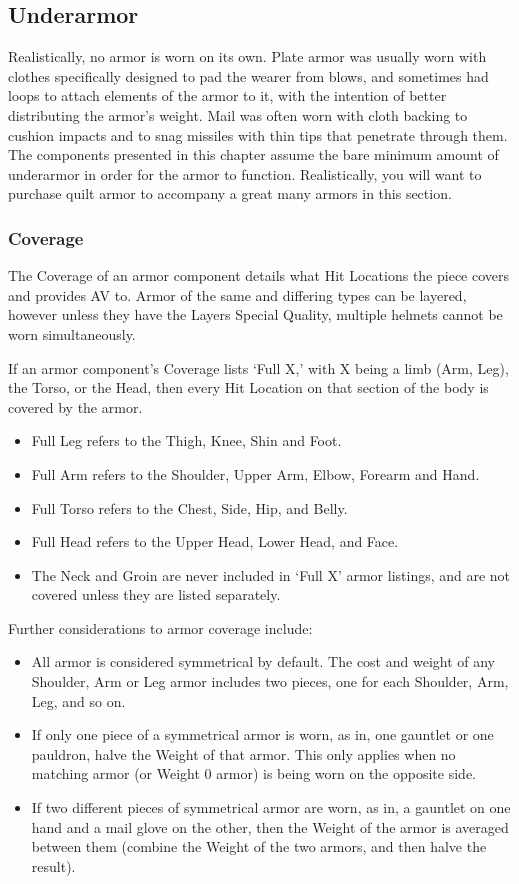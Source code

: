 \documentclass[oneside,11pt,english]{book}
\begin{document}
\subsection{Underarmor}
Realistically, no armor is worn on its own. Plate armor was usually worn with clothes specifically designed to pad the 
wearer from blows, and sometimes had loops to attach elements of the armor to it, with the intention of better 
distributing the armor’s weight. Mail was often worn with cloth backing to cushion impacts and to snag missiles with 
thin tips that penetrate through them.
The components presented in this chapter assume the bare minimum amount of underarmor in order for the armor to 
function. Realistically, you will want to purchase quilt armor to accompany a great many armors in this section.

\subsubsection{Coverage}
The Coverage of an armor component details what Hit Locations the piece covers and provides AV to. Armor of the 
same and differing types can be layered, however unless they have the Layers Special Quality, multiple helmets 
cannot be worn simultaneously.

If an armor component’s Coverage lists ‘Full X,’ with X being a limb (Arm, Leg), the Torso, or the Head, then every 
Hit Location on that section of the body is covered by the armor. 

\begin{itemize}
\item Full Leg refers to the Thigh, Knee, Shin and Foot.
\item Full Arm refers to the Shoulder, Upper Arm, Elbow, Forearm and Hand.
\item Full Torso refers to the Chest, Side, Hip, and Belly.
\item Full Head refers to the Upper Head, Lower Head, and Face.
\item The Neck and Groin are never included in ‘Full X’ armor listings, and are not covered unless they are listed 
  separately.
\end{itemize}

Further considerations to armor coverage include:
\begin{itemize}
\item All armor is considered symmetrical by default. The cost and weight of any Shoulder, Arm or Leg armor 
  includes two pieces, one for each Shoulder, Arm, Leg, and so on.
\item If only one piece of a symmetrical armor is worn, as in, one gauntlet or one pauldron, halve the Weight of 
  that armor. This only applies when no matching armor (or Weight 0 armor) is being worn on the opposite 
  side.
\item If two different pieces of symmetrical armor are worn, as in, a gauntlet on one hand and a mail glove on 
  the other, then the Weight of the armor is averaged between them (combine the Weight of the two armors, and then halve the result).
\end{itemize}
\end{document}
